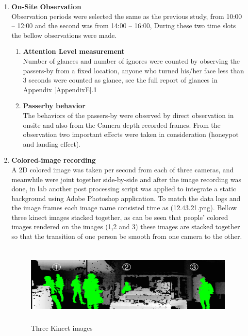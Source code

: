 \begin{enumerate}
\item \textbf{On-Site Observation} \\
Observation periods were selected the same as the previous study, from 10:00 – 12:00 and the second was from 14:00 – 16:00, During these two time slots the bellow observations were made.

\begin{enumerate}
\item \textbf{Attention Level measurement} \\
Number of glances and number of ignores were counted by observing the passers-by from a fixed location, anyone who turned his/her face less than 3 seconds were counted as glance, see the full report of glances in Appendix \ref{AppendixE}.1

\item \textbf{Passerby behavior} \\
The behaviors of the passers-by were observed by direct observation in onsite and also from the Camera depth recorded frames. From the observation two important effects were taken in consideration (honeypot and landing effect).


\end{enumerate}

\item \textbf{Colored-image recording} \\
A 2D colored image was taken per second from each of three cameras, and meanwhile were joint together side-by-side and after the image recording was done, in lab another post processing script was applied to integrate a static background using Adobe Photoshop application. To match the data logs and the image frames each image name consisted time as (12.43.21.png).
Bellow three kinect images stacked together, as can be seen that people' colored images rendered on the images (1,2 and 3) these images are stacked together so that the transition of one person be smooth from one camera to the other.

\begin{figure}[H]
   \centering
    \includegraphics[width=\textwidth,height=40mm]{Figures/9/stacked_image}%
    \caption{Three Kinect images}%
    \label{fig:threekinectimages}%
\end{figure}

\end{enumerate}



